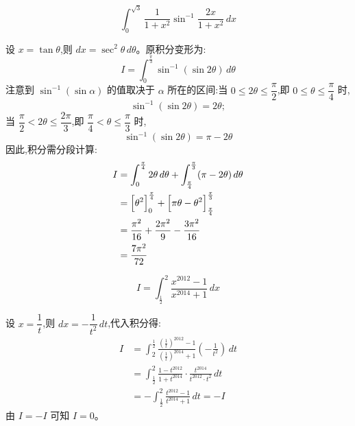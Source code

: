 \begin{questions}
    \question 
    \[
    \int_{0}^{\sqrt{3}} \frac{1}{1+x^2} \sin^{-1} \frac{2x}{1+x^2} \, dx
    \]
    \begin{solution}
        设 $x = \tan\theta$,则 $dx = \sec^2 \theta \, d\theta$。原积分变形为:
        \[
        I = \int_{0}^{\frac{\pi}{3}} \sin^{-1}(\sin 2\theta) \, d\theta
        \]
        注意到 $\sin^{-1}(\sin \alpha)$ 的值取决于 $\alpha$ 所在的区间:当 $0 \le 2\theta \le \dfrac{\pi}{2}$,即 $0 \le \theta \le \dfrac{\pi}{4}$ 时,
        \[
        \sin^{-1}(\sin 2\theta) = 2\theta;
        \]
        当 $\dfrac{\pi}{2} < 2\theta \le \dfrac{2\pi}{3}$,即 $\dfrac{\pi}{4} < \theta \le \dfrac{\pi}{3}$ 时,
        \[
        \sin^{-1}(\sin 2\theta) = \pi - 2\theta
        \]
        因此,积分需分段计算:
        \begin{align*}
        I &= \int_{0}^{\frac{\pi}{4}} 2\theta \, d\theta + \int_{\frac{\pi}{4}}^{\frac{\pi}{3}} (\pi - 2\theta) \, d\theta \\
        &= \Bigl[ \theta^2 \Bigr]_{0}^{\frac{\pi}{4}} + \Bigl[ \pi\theta - \theta^2 \Bigr]_{\frac{\pi}{4}}^{\frac{\pi}{3}} \\
        &= \frac{\pi^2}{16} + \frac{2\pi^2}{9} - \frac{3\pi^2}{16} \\
        &= \frac{7\pi^2}{72}
        \end{align*}
    \end{solution}

    \question 
    \[
    I = \int_{\frac{1}{2}}^{2} \frac{x^{2012}-1}{x^{2014}+1} \, dx
    \]
    \begin{solution}
        设 $x = \dfrac{1}{t}$,则 $dx = -\dfrac{1}{t^2} \, dt$,代入积分得:
        \begin{align*}
        I &= \int_{2}^{\frac{1}{2}} \frac{\left(\frac{1}{t}\right)^{2012}-1}{\left(\frac{1}{t}\right)^{2014}+1} \left( -\frac{1}{t^2} \right) \, dt \\
        &= \int_{\frac{1}{2}}^{2} \frac{1-t^{2012}}{1+t^{2014}} \cdot \frac{t^{2014}}{t^{2012} \cdot t^2} \, dt \\
        &= -\int_{\frac{1}{2}}^{2} \frac{t^{2012}-1}{t^{2014}+1} \, dt = -I
        \end{align*}
        由 $I = -I$ 可知 $I = 0$。
    \end{solution}


\end{questions}
